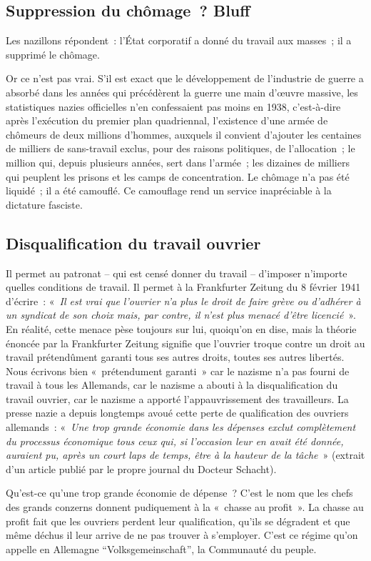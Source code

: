 \documentclass[french,twoside]{book} %
\begin{document}
\subsection[Suppression du chômage ? Bluff]{Suppression du chômage ? Bluff}
\noindent Les nazillons répondent : l’État corporatif a donné du travail aux masses ; il a supprimé le chômage.\par
Or ce n’est pas vrai. S’il est exact que le développement de l’industrie de guerre a absorbé dans les années qui précédèrent la guerre une main d’œuvre massive, les statistiques nazies officielles n’en confessaient pas moins en 1938, c’est-à-dire après l’exécution du premier plan quadriennal, l’existence d’une armée de chômeurs de deux millions d’hommes, auxquels il convient d’ajouter les centaines de milliers de sans-travail exclus, pour des raisons politiques, de l’allocation ; le million qui, depuis plusieurs années, sert dans l’armée ; les dizaines de milliers qui peuplent les prisons et les camps de concentration. Le chômage n’a pas été liquidé ; il a été camouflé. Ce camouflage rend un service inapréciable à la dictature fasciste.
\subsection[Disqualification du travail ouvrier]{Disqualification du travail ouvrier}
\noindent Il permet au patronat – qui est censé donner du travail – d’imposer n’importe quelles conditions de travail. Il permet à la Frankfurter Zeitung du 8 février 1941 d’écrire : « \emph{Il est vrai que l’ouvrier n’a plus le droit de faire grève ou d’adhérer à un syndicat de son choix mais, par contre, il n’est plus menacé d’être licencié} ». En réalité, cette menace pèse toujours sur lui, quoiqu’on en dise, mais la théorie énoncée par la Frankfurter Zeitung signifie que l’ouvrier troque contre un droit au travail prétendûment garanti tous ses autres droits, toutes ses autres libertés. Nous écrivons bien « prétendument garanti » car le nazisme n’a pas fourni de travail à tous les Allemands, car le nazisme a abouti à la disqualification du travail ouvrier, car le nazisme a apporté l’appauvrissement des travailleurs. La presse nazie a depuis longtemps avoué cette perte de qualification des ouvriers allemands : « \emph{Une trop grande économie dans les dépenses exclut complètement du processus économique tous ceux qui, si l’occasion leur en avait été donnée, auraient pu, après un court laps de temps, être à la hauteur de la tâche} » (extrait d’un article publié par le propre journal du Docteur Schacht).\par
Qu’est-ce qu’une trop grande économie de dépense ? C’est le nom que les chefs des grands conzerns donnent pudiquement à la « chasse au profit ». La chasse au profit fait que les ouvriers perdent leur qualification, qu’ils se dégradent et que même déchus il leur arrive de ne pas trouver à s’employer. C’est ce régime qu’on appelle en Allemagne “Volksgemeinschaft”, la Communauté du peuple.
\end{document}
